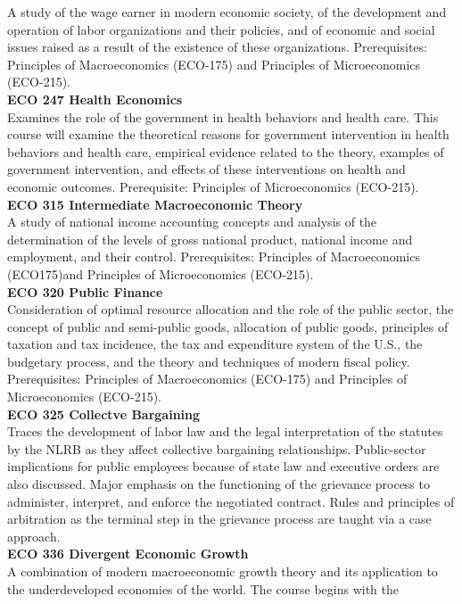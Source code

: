 \documentclass[
  letterpaper,
]{scrbook}
\begin{document}
A study of the wage earner in modern economic society, of the
development and operation of labor organizations and their policies, and
of economic and social issues raised as a result of the existence of
these organizations. Prerequisites: Principles of Macroeconomics
(ECO-175) and Principles of Microeconomics (ECO-215).\\
\textbf{ECO 247 Health Economics}\\
Examines the role of the government in health behaviors and health care.
This course will examine the theoretical reasons for government
intervention in health behaviors and health care, empirical evidence
related to the theory, examples of government intervention, and effects
of these interventions on health and economic outcomes. Prerequisite:
Principles of Microeconomics (ECO-215).\\
\textbf{ECO 315 Intermediate Macroeconomic Theory}\\
A study of national income accounting concepts and analysis of the
determination of the levels of gross national product, national income
and employment, and their control. Prerequisites: Principles of
Macroeconomics (ECO175)and Principles of Microeconomics (ECO-215).\\
\textbf{ECO 320 Public Finance}\\
Consideration of optimal resource allocation and the role of the public
sector, the concept of public and semi-public goods, allocation of
public goods, principles of taxation and tax incidence, the tax and
expenditure system of the U.S., the budgetary process, and the theory
and techniques of modern fiscal policy. Prerequisites: Principles of
Macroeconomics (ECO-175) and Principles of Microeconomics (ECO-215).\\
\textbf{ECO 325 Collectve Bargaining}\\
Traces the development of labor law and the legal interpretation of the
statutes by the NLRB as they affect collective bargaining relationships.
Public-sector implications for public employees because of state law and
executive orders are also discussed. Major emphasis on the functioning
of the grievance process to administer, interpret, and enforce the
negotiated contract. Rules and principles of arbitration as the terminal
step in the grievance process are taught via a case approach.\\
\textbf{ECO 336 Divergent Economic Growth}\\
A combination of modern macroeconomic growth theory and its application
to the underdeveloped economies of the world. The course begins with the
\end{document}
